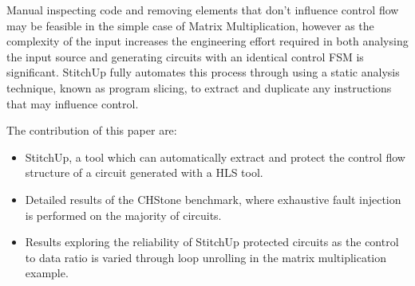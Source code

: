 Manual inspecting code and removing elements that don't influence control flow
may be feasible in the simple case of Matrix Multiplication, however as the complexity of the input increases
the engineering effort required in both analysing the input source and generating circuits with an identical control FSM is
significant.
StitchUp fully automates this process through using a static analysis technique, known as program slicing, to extract
and duplicate any instructions that may influence control.

The contribution of this paper are:
\begin{itemize}
\item StitchUp, a tool which can automatically extract and protect the control flow structure of a circuit generated with a HLS tool.
\item Detailed results of the CHStone benchmark, where exhaustive fault injection is performed on the majority of circuits.
\item Results exploring the reliability of StitchUp protected circuits as the control to data ratio is varied through
loop unrolling in the matrix multiplication example.

\end{itemize}




